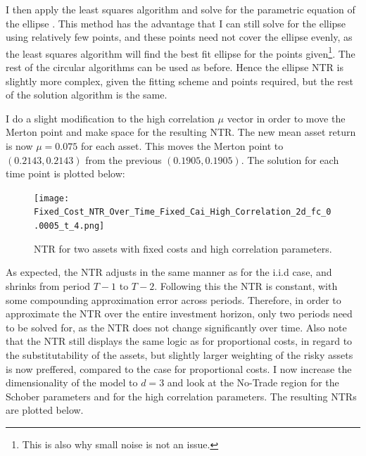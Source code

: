 \documentclass[11pt]{article}
\begin{document}
I then apply the least squares algorithm and solve for the parametric equation of the ellipse \autocites{gander1994least}{bertoni2010multi}. 
This method has the advantage that I can still solve for the ellipse using relatively few points,
and these points need not cover the ellipse evenly, as the least squares algorithm will find the best fit ellipse for the points given\footnote{This is also why small noise is not an issue.}. 
The rest of the circular algorithms can be used as before. Hence the ellipse NTR is slightly more complex, given the fitting scheme and points required,
but the rest of the solution algorithm is the same. 

I do a slight modification to the high correlation $\mu$ vector in order to move the Merton point and make space for the resulting NTR.
The new mean asset return is now $\mu = 0.075$ for each asset. This moves the Merton point to $(0.2143 , 0.2143)$ from the previous $(0.1905, 0.1905)$.
The solution for each time point is plotted below:
\begin{figure}[!ht]
    \centering
    \texttt{[image: Fixed\_Cost\_NTR\_Over\_Time\_Fixed\_Cai\_High\_Correlation\_2d\_fc\_0.0005\_t\_4.png]}
    \caption{NTR for two assets with fixed costs and high correlation parameters.}
    \label{fig: NTR_Fixed_3d_high_correlation_over_time}
\end{figure}
As expected, the NTR adjusts in the same manner as for the i.i.d case, and shrinks from period $T-1$ to $T-2$. Following this the NTR is constant,
with some compounding approximation error across periods.
Therefore, in order to approximate the NTR over the entire investment horizon, only two periods need to be solved for, as the NTR does not change significantly over time.
Also note that the NTR still displays the same logic as for proportional costs, in regard to the substitutability of the assets,
but slightly larger weighting of the risky assets is now preffered, compared to the case for proportional costs.
I now increase the dimensionality of the model to $d = 3$ and look at the No-Trade region for the Schober parameters and for the high correlation parameters.
The resulting \ac{NTR}s are plotted below.
\end{document}
